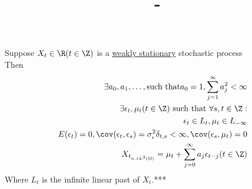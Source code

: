 \documentclass[answers,12pt,addpoints]{exam}
\author{\name}
\title{\course \ - \assignment}
\begin{document}
\maketitle
\begin{theorem}
    Suppose $X_t \in \R (t \in \Z)$ is a \hyperlink{weakly_stationary}{weakly stationary} stochastic process \\
    Then 
    \begin{align*}
        \exists a_0, a_1, \ldots, \text{such that} a_0 = 1, \sum_{j=1}^{\infty} a_j^2 < \infty \\
        \exists \epsilon_t , \mu_t (t \in \Z) \text{ such that } \forall s, t \in \Z: \\
        \epsilon_t \in L_t, \mu_t \in L_{-\infty} \\
        E(\epsilon_t) = 0, \cov(\epsilon_t, \epsilon_s) = \sigma_{\epsilon}^2 \delta_{t,s} < \infty, \cov(\epsilon_s, \mu_t) = 0 \\
        X_{t_{a.s L^2(\Omega)}} = \mu_t + \sum_{j=0}^{\infty} a_j \epsilon_{t-j} (t \in \Z) 
    \end{align*}
    Where $L_t$ is the infinite linear past of $X_t$.***
\end{theorem}
\end{document}
